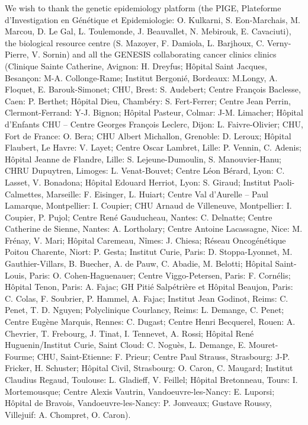 \documentclass[twocolumn, 11pt]{article}
\begin{document}
We wish to thank the genetic epidemiology platform (the PIGE, Plateforme d'Investigation en Génétique et Epidemiologie: O. Kulkarni, S. Eon-Marchais, M. Marcou, D. Le Gal, L. Toulemonde, J. Beauvallet, N. Mebirouk, E. Cavaciuti), the biological resource centre (S. Mazoyer, F. Damiola, L. Barjhoux, C. Verny-Pierre, V. Sornin) and all the GENESIS collaborating cancer clinics clinics (Clinique Sainte Catherine, Avignon: H. Dreyfus; Hôpital Saint Jacques, Besançon: M-A. Collonge-Rame; Institut Bergonié, Bordeaux: M.Longy, A. Floquet, E. Barouk-Simonet; CHU, Brest: S. Audebert; Centre François Baclesse, Caen: P. Berthet; Hôpital Dieu, Chambéry: S. Fert-Ferrer; Centre Jean Perrin, Clermont-Ferrand: Y-J. Bignon; Hôpital Pasteur, Colmar: J-M. Limacher; Hôpital d’Enfants CHU – Centre Georges François Leclerc, Dijon: L. Faivre-Olivier; CHU, Fort de France: O. Bera; CHU Albert Michallon, Grenoble: D. Leroux; Hôpital Flaubert, Le Havre: V. Layet; Centre Oscar Lambret, Lille: P. Vennin, C. Adenis; Hôpital Jeanne de Flandre, Lille: S. Lejeune-Dumoulin, S. Manouvier-Hanu; CHRU Dupuytren, Limoges: L. Venat-Bouvet; Centre Léon Bérard, Lyon: C. Lasset, V. Bonadona; Hôpital Edouard Herriot, Lyon: S. Giraud; Institut Paoli-Calmettes, Marseille: F. Eisinger, L. Huiart; Centre Val d’Aurelle – Paul Lamarque, Montpellier: I. Coupier; CHU Arnaud de Villeneuve, Montpellier: I. Coupier, P. Pujol; Centre René Gauducheau, Nantes: C. Delnatte; Centre Catherine de Sienne, Nantes: A. Lortholary; Centre Antoine Lacassagne, Nice: M. Frénay, V. Mari; Hôpital Caremeau, Nîmes: J. Chiesa; Réseau Oncogénétique Poitou Charente, Niort: P. Gesta; Institut Curie, Paris: D. Stoppa-Lyonnet, M. Gauthier-Villars, B. Buecher, A. de Pauw, C. Abadie, M. Belotti; Hôpital Saint-Louis, Paris: O. Cohen-Haguenauer; Centre Viggo-Petersen, Paris: F. Cornélis; Hôpital Tenon, Paris: A. Fajac; GH Pitié Salpétrière et Hôpital Beaujon, Paris: C. Colas, F. Soubrier, P. Hammel, A. Fajac; Institut Jean Godinot, Reims: C. Penet, T. D. Nguyen; Polyclinique Courlancy, Reims: L. Demange, C. Penet; Centre Eugène Marquis, Rennes: C. Dugast; Centre Henri Becquerel, Rouen: A. Chevrier, T. Frebourg, J. Tinat, I. Tennevet, A. Rossi; Hôpital René Huguenin/Institut Curie, Saint Cloud: C. Noguès, L. Demange, E. Mouret-Fourme; CHU, Saint-Etienne: F. Prieur; Centre Paul Strauss, Strasbourg: J-P. Fricker, H. Schuster; Hôpital Civil, Strasbourg: O. Caron, C. Maugard; Institut Claudius Regaud, Toulouse: L. Gladieff, V. Feillel; Hôpital Bretonneau, Tours: I. Mortemousque; Centre Alexis Vautrin, Vandoeuvre-les-Nancy: E. Luporsi; Hôpital de Bravois, Vandoeuvre-les-Nancy: P. Jonveaux; Gustave Roussy, Villejuif: A. Chompret, O. Caron). 
\end{document}
